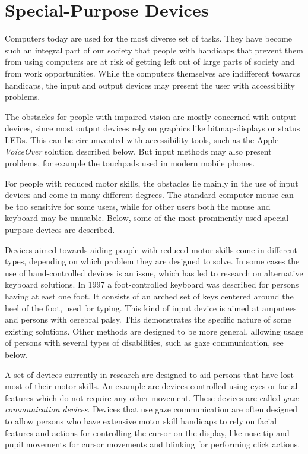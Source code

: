 
\section{Special-Purpose Devices}

Computers today are used for the most diverse set of tasks. They have become such an integral part of our society that people with handicaps that prevent them from using computers are at risk of getting left out of large parts of society and from work opportunities. While the computers themselves are indifferent towards handicaps, the input and output devices may present the user with accessibility problems.

The obstacles for people with impaired vision are mostly concerned with output devices, since most output devices rely on graphics like bitmap-displays or status LEDs. This can be circumvented with accessibility tools, such as the Apple \emph{VoiceOver} solution described below. But input methods may also present problems, for example the touchpads used in modern mobile phones.

For people with reduced motor skills, the obstacles lie mainly in the use of input devices and come in many different degrees. The standard computer mouse can be too sensitive for some users, while for other users both the mouse and keyboard may be unusable. Below, some of the most prominently used special-purpose devices are described.

Devices aimed towards aiding people with reduced motor skills come in different types, depending on which problem they are designed to solve. In some cases the use of hand-controlled devices is an issue, which has led to research on alternative keyboard solutions. In 1997 \cite{583209} a foot-controlled keyboard was described for persons having atleast one foot. It consists of an arched set of keys centered around the heel of the foot, used for typing. This kind of input device is aimed at amputees and persons with cerebral palsy. This demonstrates the specific nature of some existing solutions. Other methods are designed to be more general, allowing usage of persons with several types of disabilities, such as gaze communication, see below. 

A set of devices currently in research are designed to aid persons that have lost most of their motor skills. An example are devices controlled using eyes or facial features which do not require any other movement. These devices are called \emph{gaze communication devices}. Devices that use gaze communication are often designed to allow persons who have extensive motor skill handicaps to rely on facial features and actions for controlling the cursor on the display, like nose tip and pupil movements for cursor movements and blinking for performing click actions\cite{ieee6398171}\cite{conf/itng/AraiM11a}.

